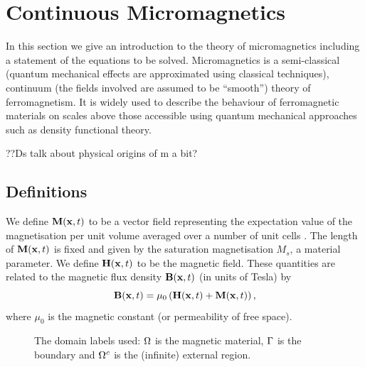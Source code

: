 \chapter{Continuous Micromagnetics}
\label{sec:cont-micromag}

In this section we give an introduction to the theory of micromagnetics including a statement of the equations to be solved.
Micromagnetics is a semi-classical (\ie quantum mechanical effects are approximated using classical techniques), continuum (\ie the fields involved are assumed to be ``smooth'') theory of ferromagnetism.
It is widely used to describe the behaviour of ferromagnetic materials on scales above those accessible using quantum mechanical approaches such as density functional theory.


??Ds talk about physical origins of m a bit?

\section{Definitions}
We define $\mathbf{M}(\mathbf{x},t)$ to be a vector field representing the expectation value of the magnetisation per unit volume averaged over a number of unit cells \cite{Aharoni1996}.
The length of $\mathbf{M}(\mathbf{x},t)$ is fixed and given by the saturation magnetisation $M_s$, a material parameter.
We define $\mathbf{H}(\mathbf{x},t)$ to be the magnetic field.
These quantities are related to the magnetic flux density $\mathbf{B}(\mathbf{x},t)$ (in units of Tesla) by
\begin{equation}
  \label{eq:37}
  \mathbf{B}(\mathbf{x},t) = \mu_0 \left( \mathbf{H}(\mathbf{x},t) + \mathbf{M}(\mathbf{x},t) \right),
\end{equation}
where $\mu_0$ is the magnetic constant (or permeability of free space).

\begin{figure}
  \center
  \caption{The domain labels used: $\Omega$ is the magnetic material, ${\Gamma}$ is the boundary and ${\Omega^c}$ is the (infinite) external region.} \label{fig:domain_labels}
\end{figure}

